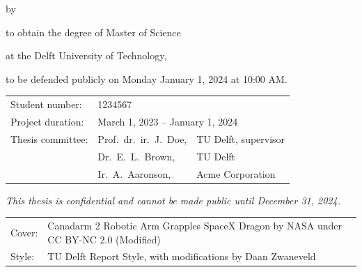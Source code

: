 \begin{titlepage}

\begin{center}

{\makeatletter
\largetitlestyle\fontsize{45}{45}\selectfont\@title
\makeatother}

{\makeatletter
\ifdefvoid{\@subtitle}{}{\bigskip\titlestyle\fontsize{20}{20}\selectfont\@subtitle}
\makeatother}

\bigskip
\bigskip

by

\bigskip
\bigskip

{\makeatletter
\largetitlestyle\fontsize{25}{25}\selectfont\@author
\makeatother}

\bigskip
\bigskip

to obtain the degree of Master of Science

at the Delft University of Technology,

to be defended publicly on Monday January 1, 2024 at 10:00 AM.

\vfill

\begin{tabular}{lll}
    Student number: & 1234567 \\
    Project duration: & \multicolumn{2}{l}{March 1, 2023 -- January 1, 2024} \\
    Thesis committee: & Prof.\ dr.\ ir.\ J.\ Doe, & TU Delft, supervisor \\
        & Dr.\ E.\ L.\ Brown, & TU Delft \\
        & Ir.\ A.\ Aaronson, & Acme Corporation
\end{tabular}

\bigskip
\bigskip
\emph{This thesis is confidential and cannot be made public until December 31, 2024.}

\bigskip
\bigskip
\begin{tabular}{p{15mm}p{10cm}}
    Cover: & Canadarm 2 Robotic Arm Grapples SpaceX Dragon by NASA under CC BY-NC 2.0 (Modified) \\
    Style: & TU Delft Report Style, with modifications by Daan Zwaneveld
\end{tabular}


\end{center}
\end{titlepage}
